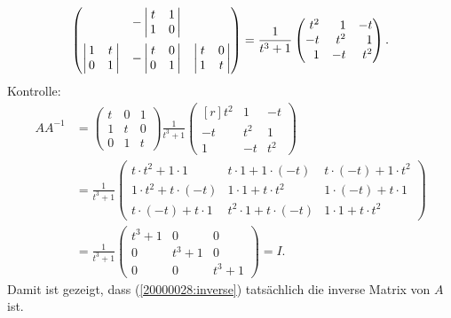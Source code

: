 \begin{loesung}
\begin{align}
\begin{pmatrix*}[r]
		&-\left|\,\begin{matrix}t&1\\1&0\end{matrix}\,\right|
			\\[11pt]
\left|\,\begin{matrix}1&t\\0&1\end{matrix}\,\right|
	&-\left|\,\begin{matrix}t&0\\0&1\end{matrix}\,\right|
		&\left|\,\begin{matrix}t&0\\1&t\end{matrix}\,\right|
\end{pmatrix*}
=\frac1{t^3+1}
\renewcommand{\arraystretch}{1}
\begin{pmatrix*}[r]
t^2&  1& -t\\
 -t&t^2&  1\\
  1& -t&t^2
\end{pmatrix*}.
\label{20000028:inverse}
\end{align}
Kontrolle:
\begin{align*}
AA^{-1}
&=
\begin{pmatrix}
t&0&1\\
1&t&0\\
0&1&t
\end{pmatrix}
\frac{1}{t^3+1}
\begin{pmatrix*}[r]
t^2&  1& -t\\
 -t&t^2&  1\\
  1& -t&t^2
\end{pmatrix*}
\\
&=
\frac{1}{t^3+1}
\begin{pmatrix}
t\cdot t^2+1\cdot 1
	&t\cdot 1+1\cdot(-t)
		&t\cdot(-t)+1\cdot t^2\\
1\cdot t^2+t\cdot (-t)
	&1\cdot 1+t\cdot t^2
		&1\cdot(-t)+t\cdot 1\\
t\cdot (-t)+t\cdot 1
	&t^2\cdot 1+t\cdot (-t)
		&1\cdot 1+t\cdot t^2
\end{pmatrix}
\\
&=
\frac1{t^3+1}
\begin{pmatrix}
t^3+1&    0&    0\\
    0&t^3+1&    0\\
    0&    0&t^3+1
\end{pmatrix}=I.
\end{align*}
Damit ist gezeigt, dass (\ref{20000028:inverse}) tatsächlich die
inverse Matrix von $A$ ist.
\end{loesung}
